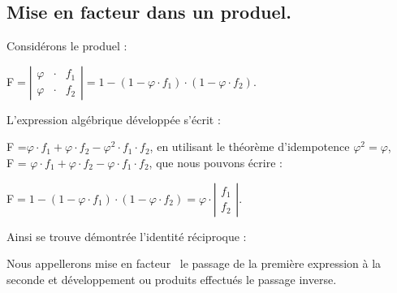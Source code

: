 \subsection{Mise en facteur dans un produel. }

Considérons le produel :

\medskip

F$=\left|\begin{array}{ccc}
\varphi & \cdot & f_{1}\\
\varphi & \cdot & f_{2}
\end{array}\right|=1-\left(1-\varphi\cdot f_{1}\right)\cdot\left(1-\varphi\cdot f_{2}\right)$.

\medskip

L'expression algébrique développée s'écrit :

\medskip

F =$\varphi\cdot f_{1}+\varphi\cdot f_{2}-\varphi^{2}\cdot f_{1}\cdot f_{2}$,
en utilisant le théorème d'idempotence $\varphi^{2}=\varphi$, \\
F = $\varphi\cdot f_{1}+\varphi\cdot f_{2}-\varphi\cdot f_{1}\cdot f_{2}$,
que nous pouvons écrire :

\medskip

F$=1-\left(1-\varphi\cdot f_{1}\right)\cdot\left(1-\varphi\cdot f_{2}\right)=\varphi\cdot\left|\begin{array}{c}
f_{1}\\
f_{2}
\end{array}\right|$.

\medskip

Ainsi se trouve démontrée l'identité réciproque :

\medskip

\begin{center}
\end{center}

\medskip

Nous appellerons \og mise en facteur~ \fg{} le passage de la première
expression à la seconde et \og développement \fg{} ou \og produits
effectués \fg{} le passage inverse.


